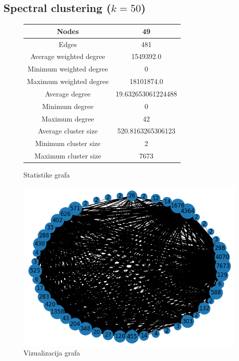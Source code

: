 \documentclass[a4paper,12pt]{article}
\begin{document}
	\subsection{Spectral clustering ($k = 50$)}
	\begin{figure}[H]
		\centering
		\begin{tabular}{ |c|c| } 
			\hline
			Nodes& 49 \\
			\hline
			Edges& 481 \\
			\hline
			Average weighted degree& 1549392.0 \\
			Minimum weighted degree& 0  \\
			Maximum weighted degree& 18101874.0 \\
			\hline
			Average degree& 19.632653061224488 \\
			Minimum degree& 0 \\ 
			Maximum degree& 42 \\
			\hline
			Average cluster size& 520.8163265306123 \\
			Minimum cluster size& 2 \\
			Maximum cluster size& 7673 \\
			\hline
			
		\end{tabular}
		\caption{Statistike grafa}
	\end{figure}
	
	\begin{figure}[H]
		\centering
		\includegraphics[scale=0.7]{spectral_merged_graph_50_visualization}
		\caption{Vizualizacija grafa}
	\end{figure}
	
\end{document}
